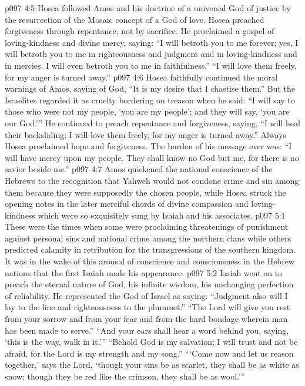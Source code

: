 \pc \vs p097 4:5 Hosea followed Amos and his doctrine of a universal God of justice by the resurrection of the Mosaic concept of a God of love. Hosea preached forgiveness through repentance, not by sacrifice. He proclaimed a gospel of loving\hyp{}kindness and divine mercy, saying: “I will betroth you to me forever; yes, I will betroth you to me in righteousness and judgment and in loving\hyp{}kindness and in mercies. I will even betroth you to me in faithfulness.” “I will love them freely, for my anger is turned away.”
\vs p097 4:6 Hosea faithfully continued the moral warnings of Amos, saying of God, “It is my desire that I chastise them.” But the Israelites regarded it as cruelty bordering on treason when he said: “I will say to those who were not my people, ‘you are my people’; and they will say, ‘you are our God.’” He continued to preach repentance and forgiveness, saying, “I will heal their backsliding; I will love them freely, for my anger is turned away.” Always Hosea proclaimed hope and forgiveness. The burden of his message ever was: “I will have mercy upon my people. They shall know no God but me, for there is no savior beside me.”\plusone
\pc \vs p097 4:7 Amos quickened the national conscience of the Hebrews to the recognition that Yahweh would not condone crime and sin among them because they were supposedly the chosen people, while Hosea struck the opening notes in the later merciful chords of divine compassion and loving\hyp{}kindness which were so exquisitely sung by Isaiah and his associates.
\vs p097 5:1 These were the times when some were proclaiming threatenings of punishment against personal sins and national crime among the northern clans while others predicted calamity in retribution for the transgressions of the southern kingdom. It was in the wake of this arousal of conscience and consciousness in the Hebrew nations that the first Isaiah made his appearance.
\vs p097 5:2 Isaiah went on to preach the eternal nature of God, his infinite wisdom, his unchanging perfection of reliability. He represented the God of Israel as saying: “Judgment also will I lay to the line and righteousness to the plummet.” “The Lord will give you rest from your sorrow and from your fear and from the hard bondage wherein man has been made to serve.” “And your ears shall hear a word behind you, saying, ‘this is the way, walk in it.’” “Behold God is my salvation; I will trust and not be afraid, for the Lord is my strength and my song.” “‘Come now and let us reason together,’ says the Lord, ‘though your sins be as scarlet, they shall be as white as snow; though they be red like the crimson, they shall be as wool.’”
